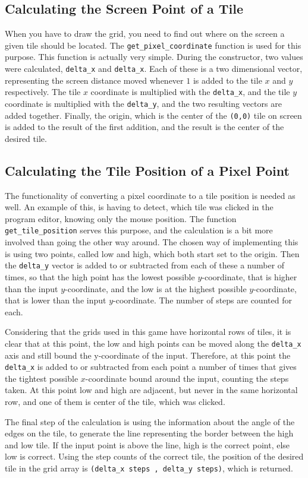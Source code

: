 \subsection{Calculating the Screen Point of a Tile}
When you have to draw the grid, you need to find out where on the screen a given tile should be located.
The \texttt{get\_pixel\_coordinate} function is used for this purpose.
This function is actually very simple.
During the constructor, two values were calculated, \verb|delta_x| and \verb|delta_x|.
Each of these is a two dimensional vector, representing the screen distance moved whenever $1$ is added to the tile $x$ and $y$ respectively.
The tile $x$ coordinate is multiplied with the \verb|delta_x|, and the tile $y$ coordinate is multiplied with the \verb|delta_y|, and the two resulting vectors are added together.
Finally, the origin, which is the center of the \texttt{(0,0)} tile on screen is added to the result of the first addition, and the result is the center of the desired tile.

\subsection{Calculating the Tile Position of a Pixel Point}
The functionality of converting a pixel coordinate to a tile position is needed as well.
An example of this, is having to detect, which tile was clicked in the program editor, knowing only the mouse position.
The function \verb|get_tile_position| serves this purpose, and the calculation is a bit more involved than going the other way around.
The chosen way of implementing this is using two points, called low and high, which both start set to the origin.
Then the \verb|delta_y| vector is added to or subtracted from each of these a number of times, so that the high point has the lowest possible $y$-coordinate, that is higher than the input $y$-coordinate, and the low is at the highest possible $y$-coordinate, that is lower than the input $y$-coordinate.
The number of steps are counted for each.

Considering that the grids used in this game have horizontal rows of tiles, it is clear that at this point, the low and high points can be moved along the \verb|delta_x| axis and still bound the y-coordinate of the input. 
Therefore, at this point the \verb|delta_x| is added to or subtracted from each point a number of times that gives the tightest possible $x$-coordinate bound around the input, counting the steps taken.
At this point low and high are adjacent, but never in the same horizontal row, and one of them is center of the tile, which was clicked.

The final step of the calculation is using the information about the angle of the edges on the tile, to generate the line representing the border between the high and low tile.
If the input point is above the line, high is the correct point, else low is correct.
Using the step counts of the correct tile, the position of the desired tile in the grid array is \verb|(delta_x steps , delta_y steps)|, which is returned.